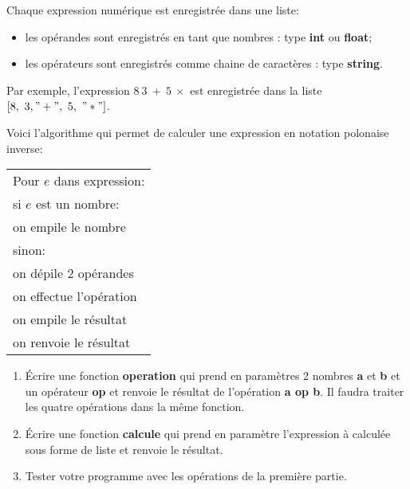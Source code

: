 \documentclass[11pt,a4paper]{article}
\begin{document}
Chaque expression numérique est enregistrée dans une liste:
\begin{itemize}
\item les opérandes sont enregistrés en tant que nombres : type \textbf{int} ou \textbf{float};
\item les opérateurs sont enregistrés comme chaine de caractères : type \textbf{string}.
\end{itemize}\medskip

Par exemple, l'expression $8~3~+~5~\times$ est enregistrée dans la liste $[8,~3,"+",~5,~"*"]$.\medskip

Voici l'algorithme qui permet de calculer une expression en notation polonaise inverse:\medskip

\begin{center}
\begin{tabular}{|p{10cm}|}
\hline
Pour $e$ dans expression:\\
\hspace{1cm}si $e$ est un nombre:\\
\hspace{2cm}on empile le nombre\\
\hspace{1cm}sinon:\\
\hspace{2cm}on dépile 2 opérandes\\
\hspace{2cm}on effectue l'opération\\
\hspace{2cm}on empile le résultat\\
on renvoie le résultat\\
\hline
\end{tabular}
\end{center}



\begin{enumerate}
\item Écrire une fonction \textbf{operation} qui prend en paramètres 2 nombres \textbf{a} et \textbf{b} et un opérateur \textbf{op} et renvoie le résultat de l'opération \textbf{a op b}. Il faudra traiter les quatre opérations dans la même fonction.
\item Écrire une fonction \textbf{calcule} qui prend en paramètre l'expression à calculée sous forme de liste et renvoie le résultat.
\item Tester votre programme avec les opérations de la première partie.
\end{enumerate}
\end{document}
